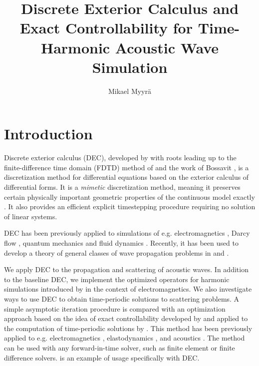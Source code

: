 \documentclass[utf8,english]{gradu3}
\title{Discrete Exterior Calculus and Exact Controllability for Time-Harmonic Acoustic Wave Simulation}
\author{Mikael Myyrä}
\begin{document}
\hfuzz=1.5pt
\maketitle
\mainmatter
\hfuzz=0pt


\chapter{Introduction}

Discrete exterior calculus (DEC),
developed by \textcite{desbrun_discrete_2005}
with roots leading up to the finite-difference time domain (FDTD)
method of \textcite{yee_numerical_1966}
and the work of Bossavit \parencite*{bossavit_geometry_1998, bossavit_computational_1999, 
bossavit_computational_2000, bossavit_generalized_2001, bossavit_discretization_2005},
is a discretization method for differential equations
based on the exterior calculus of differential forms.
It is a \textit{mimetic} discretization method,
meaning it preserves certain physically important geometric properties
of the continuous model exactly \parencite{bochev_principles_2006}.
It also provides an efficient explicit timestepping procedure
requiring no solution of linear systems.

DEC has been previously applied to simulations of e.g. electromagnetics
\parencite{rabina_efficient_2015, monkola_discrete_2022},
Darcy flow \parencite{hirani_numerical_2015},
quantum mechanics \parencite{rabina_three-dimensional_2018, kivioja_evolution_2023}
and fluid dynamics \parencite{nitschke_discrete_2017}.
Recently, it has been used to develop a theory 
of general classes of wave propagation problems
in \textcite{rabina_generalized_2018} and \textcite{rossi_systematisation_2021}.

We apply DEC to the propagation and scattering of acoustic waves.
In addition to the baseline DEC, we implement the optimized operators
for harmonic simulations introduced by \textcite{rabina_numerical_2014}
in the context of electromagnetics.
We also investigate ways to use DEC to obtain time-periodic solutions to scattering problems.
A simple asymptotic iteration procedure is compared with an optimization approach
based on the idea of exact controllability developed by \textcite{lions_exact_1988}
and applied to the computation of time-periodic solutions by
\textcite{bristeau_controllability_1998}.
This method has been previously applied to e.g.
electromagnetics \parencite{rabina_numerical_2014},
elastodynamics \parencite{monkola_time-harmonic_2008},
and acoustics \parencite{kahkonen_solution_2011}.
The method can be used with any forward-in-time solver,
such as finite element or finite difference solvers.
\textcite{rabina_numerical_2014} is an example of usage specifically with DEC.
\end{document}
